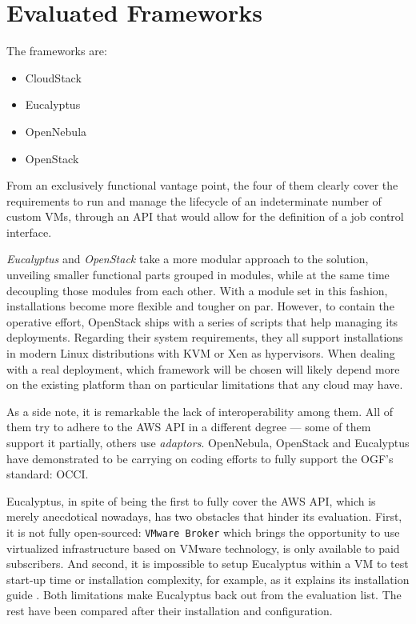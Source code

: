 \section{Evaluated Frameworks}\label{sec:frameworksevaluados}
\noindent The frameworks are:
\begin{itemize}
 \item CloudStack %
 \item Eucalyptus %
 \item OpenNebula %
 \item OpenStack
\end{itemize}

From an exclusively functional vantage point, the four of them clearly cover the requirements to run and manage the lifecycle of an indeterminate number of custom VMs, through an API that would allow for the definition of a job control interface.

\emph{Eucalyptus} and \emph{OpenStack} take a more modular approach to the solution, unveiling smaller functional parts grouped in modules, while at the same time decoupling those modules from each other. With a module set in this fashion, installations become more flexible and tougher on par. However, to contain the operative effort, OpenStack ships with a series of scripts that help managing its deployments. Regarding their system requirements, they all support installations in modern Linux distributions with KVM or Xen as hypervisors. When dealing with a real deployment, which framework will be chosen will likely depend more on the existing platform than on particular limitations that any cloud may have.

As a side note, it is remarkable the lack of interoperability among them. All of them try to adhere to the AWS API in a different degree --- some of them support it partially, others use \emph{adaptors}. OpenNebula, OpenStack and Eucalyptus have demonstrated to be carrying on coding efforts to fully support the OGF's standard: OCCI.


Eucalyptus, in spite of being the first to fully cover the AWS API, which is merely anecdotical nowadays, has two obstacles that hinder its evaluation. First, it is not fully open-sourced: \texttt{VMware Broker} which brings the opportunity to use virtualized infrastructure based on  VMware technology, is only available to paid subscribers. And second, it is impossible to setup Eucalyptus within a VM to test start-up time or installation complexity, for example, as it explains its installation guide \cite{eucainstall}. Both limitations make Eucalyptus back out from the evaluation list. The rest have been compared after their installation and configuration.

